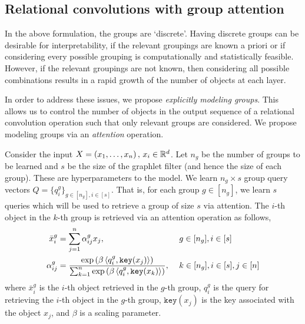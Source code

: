 \subsection{Relational convolutions with group attention}

In the above formulation, the groups are `discrete'. Having discrete groups can be desirable for interpretability, if the relevant groupings are known a priori or if considering every possible grouping is computationally and statistically feasible. However, if the relevant groupings are not known, then considering all possible combinations results in a rapid growth of the number of objects at each layer.

In order to address these issues, we propose \textit{explicitly modeling groups}. This allows us to control the number of objects in the output sequence of a relational convolution operation such that only relevant groups are considered. We propose modeling groups via an \textit{attention} operation.

Consider the input $X = \left(x_1, \ldots, x_n\right),\, x_i \in \mathbb{R}^d$. Let $n_g$ be the number of groups to be learned and $s$ be the size of the graphlet filter (and hence the size of each group). These are hyperparameters to the model. We learn $n_g \times s$ group query vectors $Q = \{q_{i}^{g}\}_{g \in [n_g], i \in [s]}$. That is, for each group $g \in [n_g]$, we learn $s$ queries which will be used to retrieve a group of size $s$ via attention. The $i$-th object in the $k$-th group is retrieved via an attention operation as follows,
\begin{equation}\label{eq:group_attn}
    \begin{aligned}
        \bar{x}_{i}^{g} &= \sum_{j = 1}^{n} \alpha_{ij}^{g} x_j, \ &&g \in [n_g],  i \in [s]\\
        \alpha_{ij}^{g} &= \frac{\exp\paren{\beta \iprod{q_i^g}{\mathtt{key}(x_j)}}}{\sum_{k = 1}^{n}{\exp\paren{\beta \iprod{q_i^g}{\mathtt{key}(x_k)}}}}, \ &&k \in [n_g], i \in [s], j \in [n]
    \end{aligned}
\end{equation}
where $\bar{x}_{i}^{g}$ is the $i$-th object retrieved in the $g$-th group, $q_{i}^{g}$ is the query for retrieving the $i$-th object in the $g$-th group, $\mathtt{key}(x_j)$ is the key associated with the object $x_j$, and $\beta$ is a scaling parameter. %

